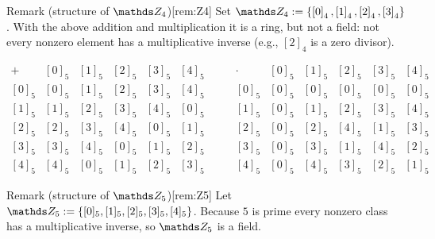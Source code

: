\documentclass[10pt]{article}
\theoremstyle{definition}
\theoremstyle{plain}
\numberwithin{equation}{section}
\begin{document}
\begin{define}{Remark (structure of $\setZ_4$)}[rem:Z4]
  Set $\setZ_4:=\{\left[0\right]_4,\left[1\right]_4,\left[2\right]_4,\left[3\right]_4\}$. With the above addition and multiplication
  it is a ring, but not a field: not every nonzero element has a multiplicative inverse
  (e.g., $\left[2\right]_4$ is a zero divisor).
\end{define}

\[
  \begin{array}{c|ccccc}
    + & \left[0\right]_5 & \left[1\right]_5 & \left[2\right]_5 & \left[3\right]_5 & \left[4\right]_5\\\hline
    \left[0\right]_5 & \left[0\right]_5 & \left[1\right]_5 & \left[2\right]_5 & \left[3\right]_5 & \left[4\right]_5\\
    \left[1\right]_5 & \left[1\right]_5 & \left[2\right]_5 & \left[3\right]_5 & \left[4\right]_5 & \left[0\right]_5\\
    \left[2\right]_5 & \left[2\right]_5 & \left[3\right]_5 & \left[4\right]_5 & \left[0\right]_5 & \left[1\right]_5\\
    \left[3\right]_5 & \left[3\right]_5 & \left[4\right]_5 & \left[0\right]_5 & \left[1\right]_5 & \left[2\right]_5\\
    \left[4\right]_5 & \left[4\right]_5 & \left[0\right]_5 & \left[1\right]_5 & \left[2\right]_5 & \left[3\right]_5
  \end{array}
  \qquad
  \begin{array}{c|ccccc}
    \cdot & \left[0\right]_5 & \left[1\right]_5 & \left[2\right]_5 & \left[3\right]_5 & \left[4\right]_5\\\hline
    \left[0\right]_5 & \left[0\right]_5 & \left[0\right]_5 & \left[0\right]_5 & \left[0\right]_5 & \left[0\right]_5\\
    \left[1\right]_5 & \left[0\right]_5 & \left[1\right]_5 & \left[2\right]_5 & \left[3\right]_5 & \left[4\right]_5\\
    \left[2\right]_5 & \left[0\right]_5 & \left[2\right]_5 & \left[4\right]_5 & \left[1\right]_5 & \left[3\right]_5\\
    \left[3\right]_5 & \left[0\right]_5 & \left[3\right]_5 & \left[1\right]_5 & \left[4\right]_5 & \left[2\right]_5\\
    \left[4\right]_5 & \left[0\right]_5 & \left[4\right]_5 & \left[3\right]_5 & \left[2\right]_5 & \left[1\right]_5
  \end{array}
\]
\begin{define}{Remark (structure of $\setZ_5$)}[rem:Z5]
Let $\setZ_5:=\{[0]_5,[1]_5,[2]_5,[3]_5,[4]_5\}$. Because $5$ is prime every nonzero
class has a multiplicative inverse, so $\setZ_5$ is a field.
\end{define}
\end{document}
